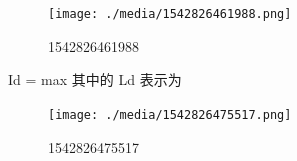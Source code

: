 \begin{figure}
\centering
\texttt{[image: ./media/1542826461988.png]}
\caption{1542826461988}
\end{figure}

Id = max 其中的 Ld 表示为

\begin{figure}
\centering
\texttt{[image: ./media/1542826475517.png]}
\caption{1542826475517}
\end{figure}










